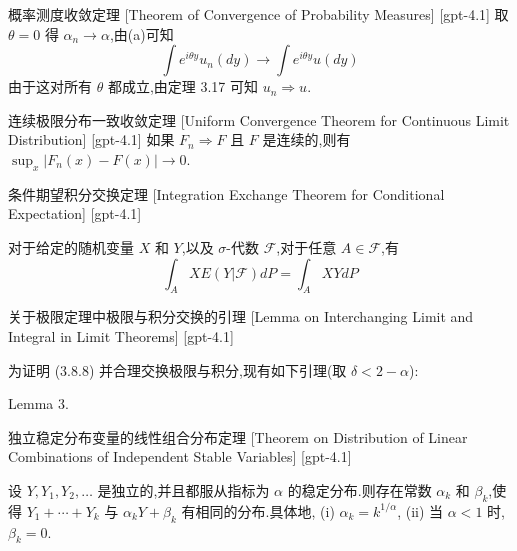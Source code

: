 \documentclass[UTF8]{ctexart}
\begin{document}
    
    
    \begin{thm}
        {概率测度收敛定理}
        [Theorem of Convergence of Probability Measures]
        [gpt-4.1]
        取 $\theta=0$ 得 $\alpha_n \to \alpha$,由(a)可知
\[
\int e^{i\theta y}
u_n(dy) \to \int e^{i\theta y}
u(dy)
\]
由于这对所有 $\theta$ 都成立,由定理 3.17 可知 $
u_n \Rightarrow 
u$.

    \end{thm}
    
    
    
    \begin{thm}
        {连续极限分布一致收敛定理}
        [Uniform Convergence Theorem for Continuous Limit Distribution]
        [gpt-4.1]
        如果 $F_n \Rightarrow F$ 且 $F$ 是连续的,则有 $\sup_x |F_n(x) - F(x)| \to 0$.
    \end{thm}
    
    
    
    \begin{thm}
        {条件期望积分交换定理}
        [Integration Exchange Theorem for Conditional Expectation]
        [gpt-4.1]
        
对于给定的随机变量 $X$ 和 $Y$,以及 $\sigma$-代数 $\mathcal{F}$,对于任意 $A \in \mathcal{F}$,有
\[
\int_{A} X E(Y|\mathcal{F}) dP = \int_{A} X Y dP
\]

    \end{thm}
    
    
    
    \begin{lma}
        {关于极限定理中极限与积分交换的引理}
        [Lemma on Interchanging Limit and Integral in Limit Theorems]
        [gpt-4.1]
        
为证明 (3.8.8) 并合理交换极限与积分,现有如下引理(取 $\delta < 2 - \alpha$):

Lemma 3.

    \end{lma}
    
    
    
    \begin{thm}
        {独立稳定分布变量的线性组合分布定理}
        [Theorem on Distribution of Linear Combinations of Independent Stable Variables]
        [gpt-4.1]
        
设 $Y, Y_{1}, Y_{2}, \dots$ 是独立的,并且都服从指标为 $\alpha$ 的稳定分布.则存在常数 $\alpha_{k}$ 和 $\beta_{k}$,使得 $Y_{1} + \cdots + Y_{k}$ 与 $\alpha_{k} Y + \beta_{k}$ 有相同的分布.具体地,
(i) $\alpha_{k} = k^{1/\alpha}$,
(ii) 当 $\alpha < 1$ 时,$\beta_{k} = 0$.

    \end{thm}
    
\end{document}
